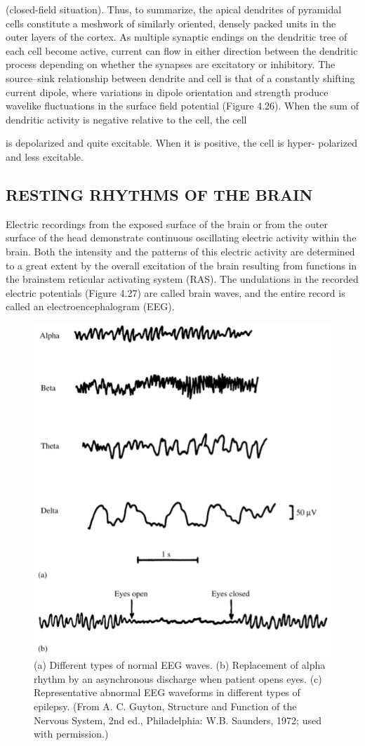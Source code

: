 (closed-field situation).
Thus, to summarize, the apical dendrites of pyramidal cells constitute a
meshwork of similarly oriented, densely packed units in the outer layers of the
cortex. As multiple synaptic endings on the dendritic tree of each cell become
active, current can flow in either direction between the dendritic process
depending on whether the synapses are excitatory or inhibitory. The
source–sink relationship between dendrite and cell is that of a constantly
shifting current dipole, where variations in dipole orientation and strength
produce wavelike fluctuations in the surface field potential (Figure 4.26).
When the sum of dendritic activity is negative relative to the cell, the cell

is depolarized and quite excitable. When it is positive, the cell is hyper-
polarized and less excitable.


\subsection{RESTING RHYTHMS OF THE BRAIN}

Electric recordings from the exposed surface of the brain or from the outer
surface of the head demonstrate continuous oscillating electric activity within
the brain. Both the intensity and the patterns of this electric activity are
determined to a great extent by the overall excitation of the brain resulting
from functions in the brainstem reticular activating system (RAS). The
undulations in the recorded electric potentials (Figure 4.27) are called brain
waves, and the entire record is called an electroencephalogram (EEG).

\begin{figure}
\centering
\includegraphics[width=0.7\linewidth]{figura_4.png} 
\caption{(a) Different types of normal EEG waves. (b) Replacement of
alpha rhythm by an asynchronous discharge when patient opens eyes.
(c) Representative abnormal EEG waveforms in different types of epilepsy.
(From A. C. Guyton, Structure and Function of the Nervous System, 2nd ed.,
Philadelphia: W.B. Saunders, 1972; used with permission.)}
\end{figure}

